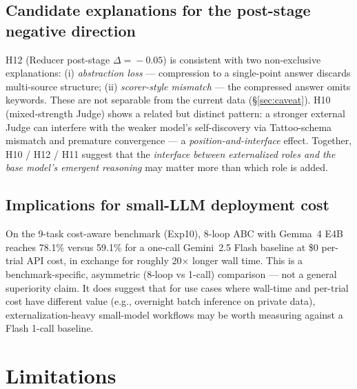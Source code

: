 \documentclass[11pt]{article}
\begin{document}
\subsection{Candidate explanations for the post-stage negative direction}
H12 (Reducer post-stage $\Delta\!=\!-0.05$) is consistent with two non-exclusive explanations: (i) \emph{abstraction loss} --- compression to a single-point answer discards multi-source structure; (ii) \emph{scorer-style mismatch} --- the compressed answer omits keywords. These are not separable from the current data (\S\ref{sec:caveat}). H10 (mixed-strength Judge) shows a related but distinct pattern: a stronger external Judge can interfere with the weaker model's self-discovery via Tattoo-schema mismatch and premature convergence --- a \emph{position-and-interface} effect. Together, H10 / H12 / H11 suggest that the \emph{interface between externalized roles and the base model's emergent reasoning} may matter more than which role is added.

\subsection{Implications for small-LLM deployment cost}\label{sec:cost}
On the 9-task cost-aware benchmark (Exp10), 8-loop ABC with Gemma~4 E4B reaches 78.1\% versus 59.1\% for a one-call Gemini~2.5 Flash baseline at \$0 per-trial API cost, in exchange for roughly 20$\times$ longer wall time. This is a benchmark-specific, asymmetric (8-loop vs 1-call) comparison --- not a general superiority claim. It does suggest that for use cases where wall-time and per-trial cost have different value (e.g., overnight batch inference on private data), externalization-heavy small-model workflows may be worth measuring against a Flash 1-call baseline.

\section{Limitations}
\end{document}
